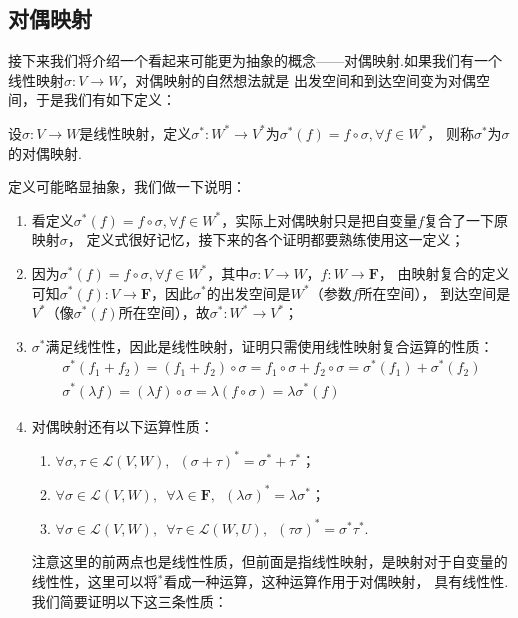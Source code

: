 \subsection{对偶映射}
接下来我们将介绍一个看起来可能更为抽象的概念——对偶映射.如果我们有一个线性映射$\sigma:V\to W$，对偶映射的自然想法就是
出发空间和到达空间变为对偶空间，于是我们有如下定义：
\begin{definition}
    设$\sigma:V\to W$是线性映射，定义$\sigma^*:W^*\to V^*$为$\sigma^*(f)=f\circ\sigma,\forall f\in W^*$，
    则称$\sigma^*$为$\sigma$的对偶映射.
\end{definition}
定义可能略显抽象，我们做一下说明：
\begin{enumerate}
    \item 看定义$\sigma^*(f)=f\circ\sigma,\forall f\in W^*$，实际上对偶映射只是把自变量$f$复合了一下原映射$\sigma$，
    定义式很好记忆，接下来的各个证明都要熟练使用这一定义；
    \item 因为$\sigma^*(f)=f\circ\sigma,\forall f\in W^*$，其中$\sigma:V\to W$，$f:W\to\mathbf{F}$，
    由映射复合的定义可知$\sigma^*(f):V\to\mathbf{F}$，因此$\sigma^*$的出发空间是$W^*$（参数$f$所在空间），
    到达空间是$V^*$（像$\sigma^*(f)$所在空间），故$\sigma^*:W^*\to V^*$；
    \item $\sigma^*$满足线性性，因此是线性映射，证明只需使用线性映射复合运算的性质：
    \begin{gather*}
        \sigma^*(f_1+f_2)=(f_1+f_2)\circ\sigma=f_1\circ\sigma+f_2\circ\sigma=\sigma^*(f_1)+\sigma^*(f_2) \\
        \sigma^*(\lambda f)=(\lambda f)\circ\sigma=\lambda(f\circ\sigma)=\lambda\sigma^*(f)
    \end{gather*}
    \item 对偶映射还有以下运算性质：
    \begin{enumerate}
        \item $\forall\sigma,\tau\in\mathcal{L}(V,W),\enspace (\sigma+\tau)^*=\sigma^*+\tau^*$；
        \item $\forall\sigma\in\mathcal{L}(V,W),\enspace \forall\lambda\in\mathbf{F},\enspace (\lambda\sigma)^*=\lambda\sigma^*$；
        \item $\forall\sigma\in\mathcal{L}(V,W),\enspace \forall\tau\in\mathcal{L}(W,U),\enspace (\tau\sigma)^*=\sigma^*\tau^*$.
    \end{enumerate}
    注意这里的前两点也是线性性质，但前面是指线性映射，是映射对于自变量的线性性，这里可以将$^*$看成一种运算，这种运算作用于对偶映射，
    具有线性性.我们简要证明以下这三条性质：
    \begin{enumerate}

\end{enumerate}
\end{enumerate}
